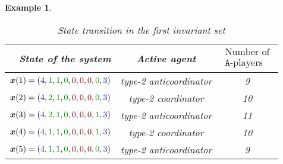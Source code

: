 \documentclass[10 pt,twocolumn,journal]{IEEEtran}
\theoremstyle{plain}
\newtheorem{example}{Example}[] %
\newcommand{\A}{\mathcal{A}}
\newcommand{\x}{\bm{x}}
\renewcommand{\A}{\mathtt{A}}
\theoremstyle{definition}
\begin{document}
\begin{example}
\begin{table}[ht]
  \begin{center}
  \caption{State transition in the first invariant set}
  \begin{tabular}{|r|c|c|}
	\hline 
	State of the system & Active agent  & $\begin{matrix} \text{Number of} \\ \text{$\A$-players}\end{matrix}$ \\  
	\hline 
	\cellcolor{MyLightYellow}
    \!\!$\x(1)=({\color{Myblue}4}, {\color{Mygreen}1}, {\color{Mygreen}1}, {\color{Mygreen}0}, {\color{Myred}0}, {\color{Myred}0}, {\color{Myred}0}, {\color{Mygreen}0}, {\color{Myblue}3})$ &   type-2 anticoordinator & 9\\ 
    $\x(2)=({\color{Myblue}4}, {\color{Mygreen}2}, {\color{Mygreen}1}, {\color{Mygreen}0}, {\color{Myred}0}, {\color{Myred}0}, {\color{Myred}0}, {\color{Mygreen}0}, {\color{Myblue}3})$ &  type-2 coordinator & 10\\ 
    $\x(3)=({\color{Myblue}4}, {\color{Mygreen}2}, {\color{Mygreen}1}, {\color{Mygreen}0}, {\color{Myred}0}, {\color{Myred}0}, {\color{Myred}0}, {\color{Mygreen}1}, {\color{Myblue}3})$ &  type-2 anticoordinator & 11\\ 
    $\x(4)=({\color{Myblue}4}, {\color{Mygreen}1}, {\color{Mygreen}1}, {\color{Mygreen}0}, {\color{Myred}0}, {\color{Myred}0}, {\color{Myred}0}, {\color{Mygreen}1}, {\color{Myblue}3})$ &  type-2 coordinator  & 10\\ 
    \cellcolor{MyLightYellow}$\x(5)=({\color{Myblue}4}, {\color{Mygreen}1}, {\color{Mygreen}1}, {\color{Mygreen}0}, {\color{Myred}0}, {\color{Myred}0}, {\color{Myred}0}, {\color{Mygreen}0}, {\color{Myblue}3})$ &  type-2 anticoordinator  & 9 \\ 
    
    
    

\end{tabular}
\end{center}
\end{table}
\end{example}
\end{document}
